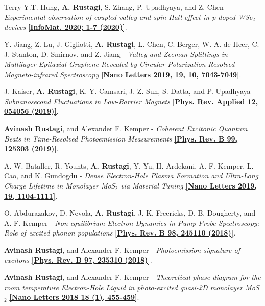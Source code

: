 \documentclass[12pt]{article}
\begin{document}
\begin{etaremune}
\item Terry Y.T. Hung, {\bf A. Rustagi}, S. Zhang, P. Upadhyaya, and Z. Chen - \textit{Experimental observation of coupled valley and spin Hall effect in p-doped WSe$_2$ devices} \href{http://dx.doi.org/10.1002/inf2.12095} {\bf[InfoMat. 2020; 1-7 (2020)]}.

\item Y. Jiang, Z. Lu, J. Gigliotti, {\bf A. Rustagi}, L. Chen, C. Berger, W. A. de Heer, C. J. Stanton, D. Smirnov, and Z. Jiang - \textit{Valley and Zeeman Splittings in Multilayer Epitaxial Graphene Revealed by Circular Polarization Resolved Magneto-infrared Spectroscopy} \href{https://doi.org/10.1021/acs.nanolett.9b02505}{\bf [Nano Letters 2019, 19, 10, 7043-7049]}.

\item J. Kaiser, {\bf A. Rustagi}, K. Y. Camsari, J. Z. Sun, S. Datta, and P. Upadhyaya - \textit{Subnanosecond Fluctuations in Low-Barrier Magnets} \href{https://doi.org/10.1103/PhysRevApplied.12.054056}{\bf [Phys. Rev. Applied 12, 054056 (2019)]}.

    \item {\bf Avinash Rustagi}, and Alexander F. Kemper - \textit{Coherent Excitonic Quantum Beats in Time-Resolved Photoemission Measurements} \href{http://doi.org/10.1103/PhysRevB.99.125303}{\bf [Phys. Rev. B 99, 125303 (2019)]}.

    \item A. W. Bataller, R. Younts, {\bf A. Rustagi}, Y. Yu,  H. Ardekani, A. F. Kemper, L. Cao, and K. Gundogdu - \textit{Dense Electron-Hole Plasma Formation and Ultra-Long Charge Lifetime in Monolayer MoS$_2$ via Material Tuning }\href{http://doi.org/10.1021/acs.nanolett.8b04408}{\bf  [Nano Letters 2019, 19, 1104-1111]}.

    \item O. Abdurazakov, D. Nevola, {\bf A. Rustagi}, J. K. Freericks, D. B. Dougherty, and A. F. Kemper - \textit{Non-equilibrium Electron Dynamics in Pump-Probe Spectroscopy: Role of excited phonon populations} \href{http://doi.org/10.1103/PhysRevB.98.245110}{\bf  [Phys. Rev. B 98, 245110 (2018)]}.

    \item {\bf Avinash Rustagi}, and Alexander F. Kemper - \textit{Photoemission signature of excitons} \href{https://link.aps.org/doi/10.1103/PhysRevB.97.235310}{\bf [Phys. Rev. B 97, 235310 (2018)]}.

	\item {\bf Avinash Rustagi}, and Alexander F. Kemper - \textit{Theoretical phase diagram for the room temperature Electron-Hole Liquid in photo-excited quasi-2D monolayer MoS$_2$} \href{http://pubs.acs.org/doi/abs/10.1021/acs.nanolett.7b04377} {\bf [Nano Letters 2018 18 (1), 455-459]}.


\end{etaremune}
\end{document}
